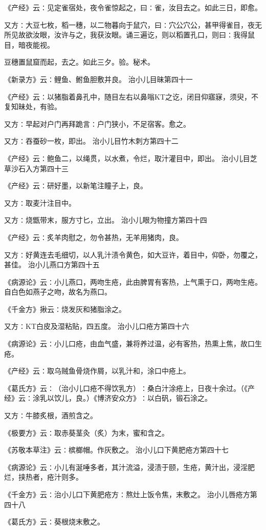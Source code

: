 \documentclass[a4paper,12pt,UTF8,twoside]{ctexbook}
\begin{document}
《产经》云∶见定雀宿处，夜令雀惊起之，曰∶雀，汝目去之。如此三日，即愈。

又方∶大豆七枚，稻一穗，以二物暮向于鼠穴，曰∶穴公穴公，甚甲得雀目，夜无所见故欲汝眼，汝许与之，我获汝眼。诵三遍讫，则以稻置孔口，则曰∶我得鼠目，暗夜能视。

豆穗置鼠窟而起，去之。如此三夕。验。秘术。

《新录方》云∶鲤鱼、鲋鱼胆敷并良。
治小儿目昧第四十一

《产经》云∶以猪脂着鼻孔中，随目左右以鼻嗡KT之讫，闭目仰寤寐，须臾，不复知昧处，有验。

又方∶早起对户门再拜跪言∶户门狭小，不足宿客。愈之。

又方∶吞蚕砂一枚，即出。
治小儿目竹木刺方第四十二

《产经》云∶鲍鱼二，以绳贯，以水煮，令烂，取汁灌目中，即出。
治小儿目芝草沙石入方第四十三

《产经》云∶研好墨，以新笔注瞳子上，良。

又方∶取麦汁注目中。

又方∶烧甑带末，服方寸匕，立出。
治小儿眼为物撞方第四十四

《产经》云∶炙羊肉慰之，勿令甚热，无羊用猪肉，良。

又方∶好黄连去毛细切，以人乳汁渍令黄色，如大豆许，着目中，仰卧，勿覆之，甚佳。
治小儿燕口方第四十五

《病源论》云∶小儿燕口，两吻生疮，此由脾胃有客热，上气熏于口，两吻生疮。自白色如燕子之吻，故名为燕口。

《千金方》揪云∶烧发灰和猪脂涂之。

又方∶KT白皮及湿粘贴，四五度。
治小儿口疮方第四十六

《病源论》云∶小儿口疮，由血气盛，兼将养过温，必有客热，热熏上焦，故口生疮。

《产经》云∶取乌贼鱼骨烧作屑，以乳汁和，涂口中疮上。

《葛氏方》云∶（治小儿口疮不得饮乳方）∶桑白汁涂疮上，日夜十余过。（《产经》云∶涂乳以饮儿，良。）《博济安众方》∶以白矾，锻石涂之。

又方∶牛膝炙根，酒煎含之。

《极要方》云∶取赤葵茎灸（炙）为末，蜜和含之。

《苏敬本草注》云∶槟榔帽。作灰敷之。
治小儿口下黄肥疮方第四十七

《病源论》云∶小儿有涎唾多者，其汁流溢，浸渍于颐，生疮，黄汁出，浸淫肥烂，挟热者，疮汁则多。

《千金方》云∶治小儿口下黄肥疮方∶熬灶上饭令焦，末敷之。
治小儿唇疮方第四十八

《葛氏方》云∶葵根烧末敷之。
\end{document}
